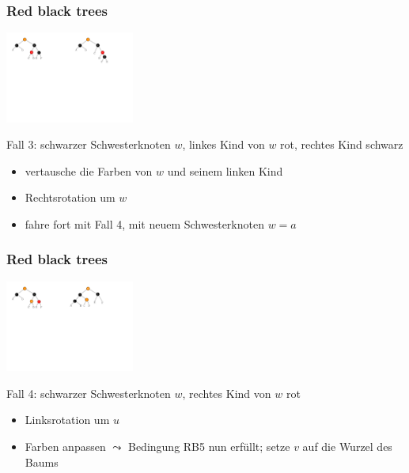 \documentclass[aspectratio=1610, 11pt]{beamer}
\newcommand{\mytitle}{Red black trees}
\begin{document}
\begin{frame}\frametitle{\mytitle}
	\includegraphics[height=30mm]{./images/rbtree_del_3.pdf}\hfill\includegraphics[height=30mm]{./images/rbtree_del_3a.pdf}
	\begin{exampleblock}{Fall 3: schwarzer Schwesterknoten $w$, linkes Kind von $w$ rot, rechtes Kind schwarz}
		\begin{itemize}
			\item vertausche die Farben von $w$ und seinem linken Kind
			\item Rechtsrotation um $w$
			\item fahre fort mit Fall 4, mit neuem Schwesterknoten $w=a$
		\end{itemize}
	\end{exampleblock}
\end{frame}

\begin{frame}\frametitle{\mytitle}
	\includegraphics[height=30mm]{./images/rbtree_del_4.pdf}\hfill\includegraphics[height=30mm]{./images/rbtree_del_4a.pdf}
	\begin{exampleblock}{Fall 4: schwarzer Schwesterknoten $w$, rechtes Kind von $w$ rot}
		\begin{itemize}
			\item Linksrotation um $u$
			\item Farben anpassen $\leadsto$ Bedingung RB5 nun erf\"ullt; setze $v$ auf die Wurzel des Baums
		\end{itemize}
	\end{exampleblock}
\end{frame}
\end{document}
